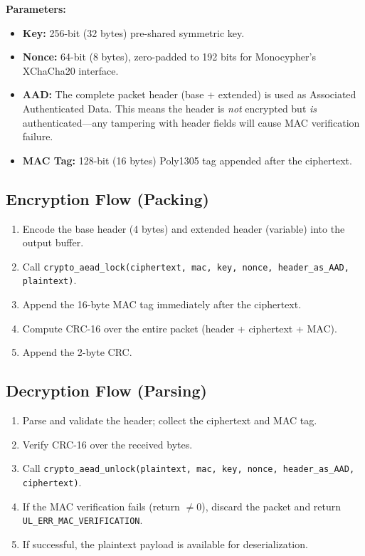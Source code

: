 \documentclass[11pt,a4paper]{article}
\begin{document}
\textbf{Parameters:}
\begin{itemize}[noitemsep]
    \item \textbf{Key:} 256-bit (32 bytes) pre-shared symmetric key.
    \item \textbf{Nonce:} 64-bit (8 bytes), zero-padded to 192 bits for Monocypher's XChaCha20 interface.
    \item \textbf{AAD:} The complete packet header (base + extended) is used as Associated Authenticated Data. This means the header is \emph{not} encrypted but \emph{is} authenticated---any tampering with header fields will cause MAC verification failure.
    \item \textbf{MAC Tag:} 128-bit (16 bytes) Poly1305 tag appended after the ciphertext.
\end{itemize}

\subsection{Encryption Flow (Packing)}

\begin{enumerate}[noitemsep]
    \item Encode the base header (4 bytes) and extended header (variable) into the output buffer.
    \item Call \texttt{crypto\_aead\_lock(ciphertext, mac, key, nonce, header\_as\_AAD, plaintext)}.
    \item Append the 16-byte MAC tag immediately after the ciphertext.
    \item Compute CRC-16 over the entire packet (header + ciphertext + MAC).
    \item Append the 2-byte CRC.
\end{enumerate}

\subsection{Decryption Flow (Parsing)}

\begin{enumerate}[noitemsep]
    \item Parse and validate the header; collect the ciphertext and MAC tag.
    \item Verify CRC-16 over the received bytes.
    \item Call \texttt{crypto\_aead\_unlock(plaintext, mac, key, nonce, header\_as\_AAD, ciphertext)}.
    \item If the MAC verification fails (return $\neq 0$), discard the packet and return \texttt{UL\_ERR\_MAC\_VERIFICATION}.
    \item If successful, the plaintext payload is available for deserialization.
\end{enumerate}
\end{document}
